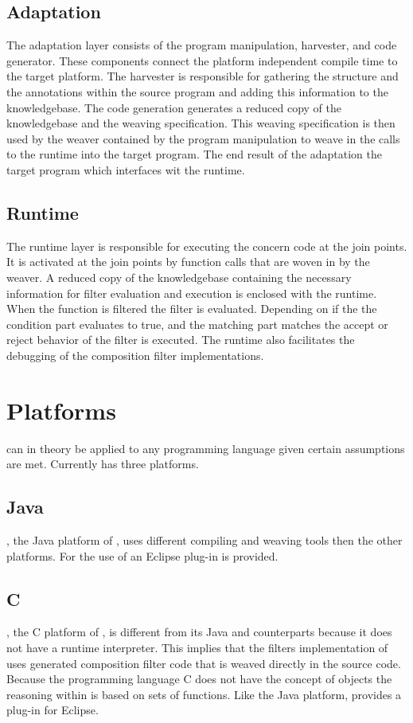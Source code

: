 \subsection{Adaptation}
The adaptation layer consists of the program manipulation, harvester, and code generator.
These components connect the platform independent compile time to the target platform.
The harvester is responsible for gathering the structure and the annotations within the source program and adding this information to the knowledgebase.
The code generation generates a reduced copy of the knowledgebase and the weaving specification.
This weaving specification is then used by the weaver contained by the program manipulation to weave in the calls to the runtime into the target program.
The end result of the adaptation the target program which interfaces wit the runtime.

\subsection{Runtime}
The runtime layer is responsible for executing the concern code at the join points.
It is activated at the join points by function calls that are woven in by the weaver.
A reduced copy of the knowledgebase containing the necessary information for filter evaluation and execution is enclosed with the runtime.
When the function is filtered the filter is evaluated.
Depending on if the the condition part evaluates to true, and the matching part matches the accept or reject behavior of the filter is executed.
The runtime also facilitates the debugging of the composition filter implementations.

\section{Platforms}
\Compose* can in theory be applied to any programming language given certain assumptions are met. 
Currently \Compose* has three platforms.

\subsection{Java}
\Compose*[J], the Java platform of \Compose*, uses different compiling and weaving tools then the other platforms.
For the use of \Compose*[J] an Eclipse plug-in is provided. 

\subsection{C}
\Compose*[C], the C platform of \Compose*, is different from its Java and \dotNET counterparts because it does not have a runtime interpreter.
This implies that the filters implementation of \Compose*[C] uses generated composition filter code that is weaved directly in the source code.
Because the programming language C does not have the concept of objects the reasoning within \Compose* is based on sets of functions.
Like the Java platform, \Compose*[C] provides a plug-in for Eclipse.

